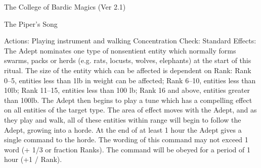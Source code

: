 \begin{Chapter}{The College of Bardic Magics (Ver 2.1)}
\begin{ritual}[R-4]{The Piper’s Song}

Actions: Playing instrument and walking 
Concentration Check: Standard 
Effects:  The  Adept  nominates  one  type  of  nonsentient  entity  which  normally  forms  swarms, 
packs  or  herds  (e.g.  rats,  locusts,  wolves,  elephants)  at  the  start  of  this  ritual.  The  size  of  the 
entity which can be affected is dependent on Rank: 
Rank  0–5,  entities  less  than  1lb  in  weight  can  be 
affected;  Rank  6–10,  entities  less  than  10lb;  Rank 
11–15,  entities  less  than  100  lb;  Rank  16  and 
above,  entities  greater  than 100lb.  The  Adept  then 
begins to play a tune which has a compelling effect 
on all entities of the target type. The area of effect 
moves  with the Adept, and as they play and walk, 
all  of  these  entities  within  range  will  begin  to  follow the Adept, growing into a horde. At the end of 
at  least  1  hour  the  Adept  gives  a  single  command 
to  the  horde.  The  wording  of  this  command  may 
not  exceed  1  word  (+  1/3  or  fraction  Ranks).  The 
command will be obeyed for a period of 1 hour (+1 
/ Rank). 
\end{ritual}

\end{Chapter}
